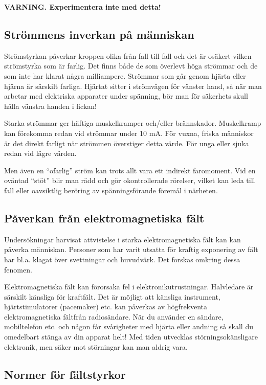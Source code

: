\textbf{VARNING. Experimentera inte med detta!}


\subsection{Strömmens inverkan på människan}

Strömstyrkan påverkar kroppen olika från fall till fall och det är
osäkert vilken strömstyrka som är farlig. Det finns både de som
överlevt höga strömmar och de som inte har klarat några
milliampere. Strömmar som går genom hjärta eller hjärna är särskilt
farliga.  Hjärtat sitter i strömvägen för vänster hand, så när man
arbetar med elektriska apparater under spänning, bör man för säkerhets
skull hålla vänstra handen i fickan!

Starka strömmar ger häftiga muskelkramper och/eller
brännskador. Muskelkramp kan förekomma redan vid strömmar under 10
mA. För vuxna, friska människor är det direkt farligt när strömmen
överstiger detta värde.  För unga eller sjuka redan vid lägre värden.

Men även en ``ofarlig'' ström kan trots allt vara ett indirekt
faromoment. Vid en oväntad ``stöt'' blir man rädd och gör okontrollerade
rörelser, vilket kan leda till fall eller oavsiktlig beröring av
spänningsförande föremål i närheten.

\subsection{Påverkan från elektromagnetiska fält}

Undersökningar harvisat attvistelse i starka elektromagnetiska fält
kan kan påverka människan. Personer som har varit utsatta för kraftig
exponering av fält har bl.a. klagat över svettningar och
huvudvärk. Det forskas omkring dessa fenomen.

Elektromagnetiska fält kan förorsaka fel i
elektronikutrustningar. Halvledare är särskilt känsliga för
kraftfält. Det är möjligt att känsliga instrument, hjärtstimulatorer
(pacemaker) etc. kan påverkas av högfrekventa elektromagnetiska
fältfrån radiosändare. När du använder en sändare, mobiltelefon etc.
och någon får svårigheter med hjärta eller andning så skall du
omedelbart stänga av din apparat helt! Med tiden utvecklas
störningsokänsligare elektronik, men säker mot störningar kan man
aldrig vara.

\subsection{Normer för fältstyrkor}

